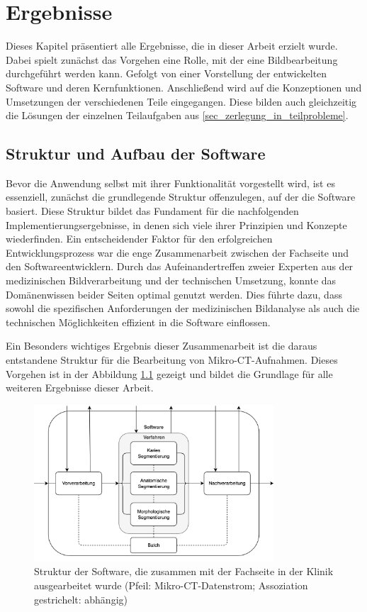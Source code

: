 \chapter{Ergebnisse}
\label{chap:ergebnisse} Dieses Kapitel präsentiert alle Ergebnisse, die in
dieser Arbeit erzielt wurde. Dabei spielt zunächst das Vorgehen eine Rolle, mit
der eine Bildbearbeitung durchgeführt werden kann. Gefolgt von einer Vorstellung
der entwickelten Software und deren Kernfunktionen. Anschließend wird auf die
Konzeptionen und Umsetzungen der verschiedenen Teile eingegangen. Diese bilden auch
gleichzeitig die Lösungen der einzelnen Teilaufgaben aus \ref{sec_zerlegung_in_teilprobleme}.

\section{Struktur und Aufbau der Software}
\label{sec:struktur_der_software} Bevor die Anwendung selbst mit ihrer Funktionalität
vorgestellt wird, ist es essenziell, zunächst die grundlegende Struktur offenzulegen,
auf der die Software basiert. Diese Struktur bildet das Fundament für die nachfolgenden
Implementierungsergebnisse, in denen sich viele ihrer Prinzipien und Konzepte
wiederfinden. Ein entscheidender Faktor für den erfolgreichen Entwicklungsprozess
war die enge Zusammenarbeit zwischen der Fachseite und den Softwareentwicklern.
Durch das Aufeinandertreffen zweier Experten aus der medizinischen
Bildverarbeitung und der technischen Umsetzung, konnte das Domänenwissen beider Seiten
optimal genutzt werden. Dies führte dazu, dass sowohl die spezifischen Anforderungen
der medizinischen Bildanalyse als auch die technischen Möglichkeiten effizient in
die Software einflossen.

Ein Besonders wichtiges Ergebnis dieser Zusammenarbeit ist die daraus entstandene
Struktur für die Bearbeitung von Mikro-\ac{CT}-Aufnahmen. Dieses Vorgehen ist in
der Abbildung \ref{fig:struktur_der_software} gezeigt und bildet die Grundlage für
alle weiteren Ergebnisse dieser Arbeit.

\begin{figure}[h]
	\centering
	\includegraphics[width=0.8\textwidth]{img/struktur_der_software.png}
	\caption{Struktur der Software, die zusammen mit der Fachseite in der Klinik ausgearbeitet
	wurde (Pfeil: Mikro-CT-Datenstrom; Assoziation gestrichelt: abhängig)}
	\label{fig:struktur_der_software}
\end{figure}

